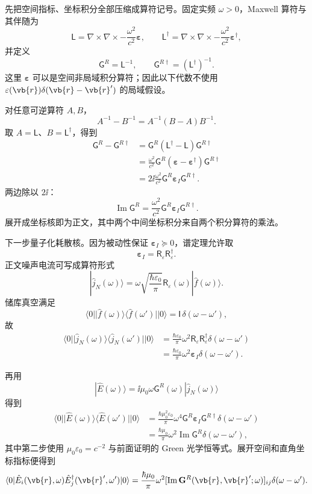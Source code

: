 \begin{derivation}
先把空间指标、坐标积分全部压缩成算符记号。固定实频 $\omega>0$，Maxwell 算符与其伴随为
\[
\mathsf L
=\nabla\times\nabla\times
-\frac{\omega^2}{c^2}\boldsymbol\varepsilon,
\qquad
\mathsf L^\dagger
=\nabla\times\nabla\times
-\frac{\omega^2}{c^2}\boldsymbol\varepsilon^\dagger,
\]
并定义
\[
\mathsf G^R=\mathsf L^{-1},
\qquad
\mathsf G^{R\dagger}=(\mathsf L^\dagger)^{-1}.
\]
这里 $\boldsymbol\varepsilon$ 可以是空间非局域积分算符；因此以下代数不使用
$\varepsilon(\vb{r})\delta(\vb{r}-\vb{r}')$ 的局域假设。

对任意可逆算符 $A,B$，
\[
A^{-1}-B^{-1}=A^{-1}(B-A)B^{-1}.
\]
取 $A=\mathsf L$、$B=\mathsf L^\dagger$，得到
\begin{align*}
\mathsf G^R-\mathsf G^{R\dagger}
&=\mathsf G^R(\mathsf L^\dagger-\mathsf L)\mathsf G^{R\dagger}\\
&=\frac{\omega^2}{c^2}
\mathsf G^R(\boldsymbol\varepsilon-\boldsymbol\varepsilon^\dagger)
\mathsf G^{R\dagger}\\
&=2\ii\frac{\omega^2}{c^2}
\mathsf G^R\boldsymbol\varepsilon_I\mathsf G^{R\dagger}.
\end{align*}
两边除以 $2\ii$：
\[
\operatorname{Im}\mathsf G^R
=\frac{\omega^2}{c^2}
\mathsf G^R\boldsymbol\varepsilon_I\mathsf G^{R\dagger}.
\]
展开成坐标核即为正文，其中两个中间坐标积分来自两个积分算符的乘法。

下一步量子化耗散核。因为被动性保证
$\boldsymbol\varepsilon_I\succeq0$，谱定理允许取
\[
\boldsymbol\varepsilon_I
=\mathsf R_\varepsilon\mathsf R_\varepsilon^\dagger.
\]
正文噪声电流可写成算符形式
\[
|\hat j_N(\omega)\rangle
=\omega\sqrt{\frac{\hbar\varepsilon_0}{\pi}}
\mathsf R_\varepsilon(\omega)|\hat f(\omega)\rangle.
\]
储库真空满足
\[
\langle0|
|\hat f(\omega)\rangle\langle\hat f(\omega')|
|0\rangle
=\mathsf I\,\delta(\omega-\omega'),
\]
故
\begin{align*}
\langle0|
|\hat j_N(\omega)\rangle\langle\hat j_N(\omega')|
|0\rangle
&=\frac{\hbar\varepsilon_0}{\pi}\omega^2
\mathsf R_\varepsilon\mathsf R_\varepsilon^\dagger
\delta(\omega-\omega')\\
&=\frac{\hbar\varepsilon_0}{\pi}\omega^2
\boldsymbol\varepsilon_I
\delta(\omega-\omega').
\end{align*}

再用
\[
|\hat E(\omega)\rangle
=\ii\mu_0\omega\mathsf G^R(\omega)|\hat j_N(\omega)\rangle
\]
得到
\begin{align*}
\langle0|
|\hat E(\omega)\rangle\langle\hat E(\omega')|
|0\rangle
&=\frac{\hbar\mu_0^2\varepsilon_0}{\pi}\omega^4
\mathsf G^R\boldsymbol\varepsilon_I\mathsf G^{R\dagger}
\delta(\omega-\omega')\\
&=\frac{\hbar\mu_0}{\pi}\omega^2
\operatorname{Im}\mathsf G^R
\delta(\omega-\omega'),
\end{align*}
其中第二步使用
$\mu_0\varepsilon_0=c^{-2}$ 与前面证明的 Green 光学恒等式。展开空间和直角坐标指标便得到
\[
{
\langle0|
\hat E_i(\vb{r},\omega)
\hat E_j^\dagger(\vb{r}',\omega')
|0\rangle
=\frac{\hbar\mu_0}{\pi}\omega^2
[\operatorname{Im}\mathbf G^R(\vb{r},\vb{r}';\omega)]_{ij}
\delta(\omega-\omega').}
\]


\end{derivation}
